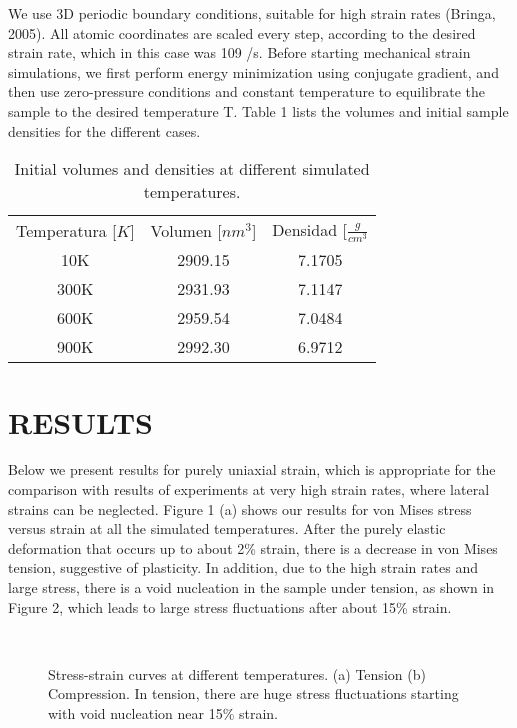 We use 3D periodic boundary conditions, suitable for high strain rates (Bringa, 2005). All atomic coordinates are scaled every step, according to the desired strain rate, which in this case was 109 /s. Before starting mechanical strain simulations, we first perform energy minimization using conjugate gradient, and then use zero-pressure conditions and constant temperature to equilibrate the sample to the desired temperature T. Table 1 lists the volumes and initial sample densities for the different cases.

\begin{table}[htp]
\caption{Initial volumes and densities at different simulated temperatures.}
\begin{center}
\begin{tabular}{*{3}{c}}
Temperatura [$K$] & Volumen [$nm^{3}$] & Densidad [$\frac{g}{cm^{3}}$ \\
10K & 2909.15 & 7.1705 \\
300K & 2931.93 & 7.1147 \\
600K & 2959.54 & 7.0484 \\
900K & 2992.30 & 6.9712
\end{tabular}
\end{center}
\label{C3:tb:initprops}
\end{table}

\section{RESULTS}
Below we present results for purely uniaxial strain, which is appropriate for the comparison with results of experiments at very high strain rates, where lateral strains can be neglected.
Figure 1 (a) shows our results for von Mises stress versus strain at all the simulated temperatures. After the purely elastic deformation that occurs up to about 2\% strain, there is a decrease in von Mises tension, suggestive of plasticity. In addition, due to the high strain rates and large stress, there is a void nucleation in the sample under tension, as shown in Figure 2, which leads to large stress fluctuations after about 15\% strain.

\begin{figure}[htp]
\centering
{}
\\
\caption{Stress-strain curves at different temperatures. (a) Tension (b) Compression. In tension, there are huge stress fluctuations starting with void nucleation near 15\% strain.}
\label{figure:msd_Cu}
\end{figure}

